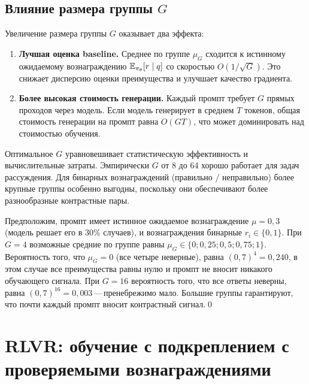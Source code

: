 \subsection{Влияние размера группы $G$}

Увеличение размера группы $G$ оказывает два эффекта:
\begin{enumerate}[leftmargin=*]
  \item \textbf{Лучшая оценка baseline.} Среднее по группе $\mu_G$ сходится к истинному ожидаемому вознаграждению $\operatorname{\mathbb{E}}_{\pi_\theta}[r \mid q]$ со скоростью $O(1/\sqrt{G})$. Это снижает дисперсию оценки преимущества и улучшает качество градиента.
  \item \textbf{Более высокая стоимость генерации.} Каждый промпт требует $G$ прямых проходов через модель. Если модель генерирует в среднем $T$ токенов, общая стоимость генерации на промпт равна $O(GT)$, что может доминировать над стоимостью обучения.
\end{enumerate}
Оптимальное $G$ уравновешивает статистическую эффективность и вычислительные затраты. Эмпирически $G$ от 8 до 64 хорошо работает для задач рассуждения. Для бинарных вознаграждений (правильно / неправильно) более крупные группы особенно выгодны, поскольку они обеспечивают более разнообразные контрастные пары.

\begin{example}
\label{ex:grpo-group-size}
Предположим, промпт имеет истинное ожидаемое вознаграждение $\mu = 0{,}3$ (модель решает его в 30\% случаев), и вознаграждения бинарные $r_i \in \{0, 1\}$. При $G = 4$ возможные средние по группе равны $\mu_G \in \{0; 0{,}25; 0{,}5; 0{,}75; 1\}$. Вероятность того, что $\mu_G = 0$ (все четыре неверные), равна $(0{,}7)^4 = 0{,}240$, в этом случае все преимущества равны нулю и промпт не вносит никакого обучающего сигнала. При $G = 16$ вероятность того, что все ответы неверны, равна $(0{,}7)^{16} = 0{,}003$\,---\,пренебрежимо мало. Большие группы гарантируют, что почти каждый промпт вносит контрастный сигнал.\qed
\end{example}

\section{RLVR: обучение с подкреплением с проверяемыми вознаграждениями}
\label{sec:rlvr}


